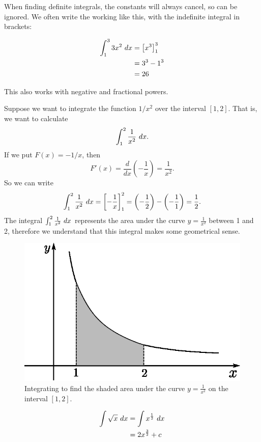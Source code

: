 When finding definite integrals, the constants will always cancel, so can be ignored. We often write the working like this, with the indefinite integral in brackets:

\begin{example}
\begin{align*}
\int_1^3 3x^2\ dx&=\left[x^3\right]_1^3\\
&=3^3-1^3\\
&=26
\end{align*}
\end{example}

This also works with negative and fractional powers.

\begin{example}
Suppose we want to integrate the function $1/x^2$ over the interval $[1,2]$. That is, we want to calculate
\[\int_1^2 \frac{1}{x^2}\ dx.\]
If we put $F(x)=-1/x$, then 
\[F'(x)=\frac{d}{dx}\left(-\frac{1}{x}\right)=\frac{1}{x^2}.\]
So we can write
\[\int_1^2\frac{1}{x^2}\ dx=\left[-\frac{1}{x}\right]_1^2=\left(-\frac{1}{2}\right)-\left(-\frac{1}{1}\right)=\frac{1}{2}.\]
The integral $\int_1^2\frac{1}{x^2}\ dx$ represents the area under the curve $y=\frac{1}{x^2}$ between 1 and 2, therefore we understand that this integral makes some geometrical sense.

\begin{figure}[H]
\centering
\includegraphics[scale=0.8]{img/integration-graph-over-x-squared}
\caption{Integrating to find the shaded area under the curve $y=\frac{1}{x^2}$ on the interval $[1,2]$.}
\end{figure}
\end{example}

\begin{example}
\begin{align*}
\int \sqrt{x}\ dx&=\int x^\frac{1}{2}\ dx\\
&=2x^\frac{3}{2}+c
\end{align*}
\end{example}

